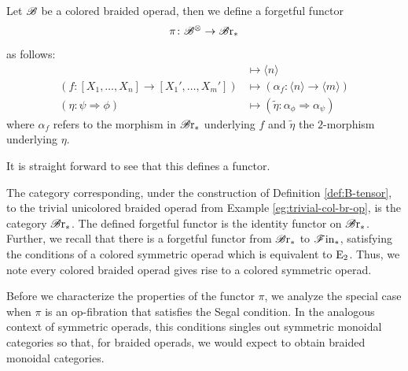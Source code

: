 \begin{defin}
Let $\mathscr{B}$ be a colored braided operad, then we define a forgetful functor
\[
    \pi \colon \mathscr{B}^{\otimes} \to \mathscr{B} \text{r}_{\ast}
\]
as follows:
\begin{align*}
    [X_1, \dots, X_n] &\mapsto \langle n \rangle \\
    (f \colon [X_1, \dots, X_n] \to [X_1', \dots, X_m']) &\mapsto (\alpha_f \colon \langle n \rangle \to \langle m \rangle) \\
    (\eta \colon \psi \Rightarrow \phi) &\mapsto (\widetilde{\eta} \colon \alpha_{\phi} \Rightarrow \alpha_{\psi})
\end{align*}
where $\alpha_f$ refers to the morphism in $\mathscr{B} \text{r}_{\ast}$ underlying $f$ and
$\widetilde{\eta}$ the $2$-morphism underlying $\eta$. 
\end{defin}
It is straight forward to see that this defines a functor.

\begin{eg}\label{eg:br-fib-trivial} The category corresponding, under the
    construction of Definition \ref{def:B-tensor}, to the trivial unicolored
    braided operad from Example \ref{eg:trivial-col-br-op}, is the category
    $\mathscr{B} \text{r}_{\ast}$. The defined forgetful functor is the identity functor on $\mathscr{B} \text{r}_{\ast}$.
    Further, we recall that there is a forgetful functor from $\mathscr{B} \text{r}_{\ast}$ to $\mathscr{F} \text{in}_{\ast}$,
    satisfying the conditions of a colored symmetric operad which is equivalent
    to $\operatorname{E}_2$. Thus, we note every colored braided operad gives rise to a
    colored symmetric operad.
\end{eg}

Before we characterize the properties of the functor $\pi$, we analyze the
special case when $\pi$ is an op-fibration that satisfies the Segal condition.
In the analogous context of symmetric operads, this conditions singles out
symmetric monoidal categories so that, for braided operads, we would expect to
obtain braided monoidal categories.






